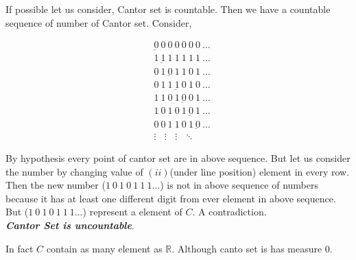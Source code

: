If possible let us consider, Cantor set is countable. Then we have a countable sequence of number of Cantor set.
Consider,
\begin{center}
    \Large
    \begin{align*}
        & \underbar{0}\ 0\ 0\ 0\ 0\ 0\ 0\ \ldots \\
        & 1\ \underbar{1}\ 1\ 1\ 1\ 1\ 1\ \ldots \\
        & 0\ 1\ \underbar{0}\ 1\ 1\ 0\ 1\ \ldots \\
        & 0\ 1\ 1\ \underbar{1}\ 0\ 1\ 0\ \ldots \\
        & 1\ 1\ 0\ 1\ \underbar{0}\ 0\ 1\ \ldots \\
        & 1\ 0\ 1\ 0\ 1\ \underbar{0}\ 1\ \ldots \\
        & 0\ 0\ 1\ 1\ 0\ 1\ \underbar{0}\ \ldots \\
        &\vdots\ \ \ \ \vdots\ \ \ \ \vdots\ \ \ \ddots 
    \end{align*}
\end{center}
By hypothesis every point of cantor set are in above sequence. But let us consider the number by changing value of $(ii)$(under line position) element in every row.
Then the new number  ($1\ 0\ 1\ 0\ 1\ 1\ 1 \ldots$) is not in above sequence of numbers because it has at least one different digit from ever element in above sequence. But ($1\ 0\ 1\ 0\ 1\ 1\ 1 \ldots$) represent a element of $C$. A contradiction.\\
\textit{\textbf{Cantor Set is uncountable}}.

In fact $C$ contain as many element as  $\mathds{R}$. Although canto set is has measure $0$.

